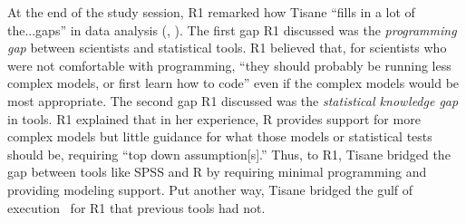 \begin{comment}
R1 explained how in the past, she had run a series of tests only to learn later
that she should have been using GLMs. Even when she constructed the GLMs, %
she expressed uncertainty about her choice of family function: ``I don't know
[what] I was exactly picking...like Poisson regression or whatever.''
R1 explained that she was given little guidance on choosing a model; another
student just told her, ```This is what I did. So you should just do that.''' In
contrast, R1 really liked having the normality checks and data histograms
available in the Tisane GUI to be more aware of the data (\rqCognitive).
\end{comment}

At the end of the study session, R1 remarked how Tisane ``fills in a lot of
the...gaps'' in data analysis (\rqWorkflow, \rqCognitive). The first gap R1
discussed was the \emph{programming gap} between scientists and statistical
tools. R1 believed that, for scientists who were not comfortable with
programming, ``they should probably be running less complex models, or first
learn how to code'' even if the complex models would be most appropriate. The
second gap R1 discussed was the \emph{statistical knowledge gap} in tools. R1 explained that
in her experience, R provides support for more complex models but little
guidance for what those models or statistical tests should be, requiring ``top
down assumption[s].'' Thus, to R1, Tisane bridged the gap between tools like
SPSS and R by requiring minimal programming and providing modeling support. Put
another way, Tisane bridged the gulf of execution~\cite{norman2013doet} for R1
that previous tools had not.



